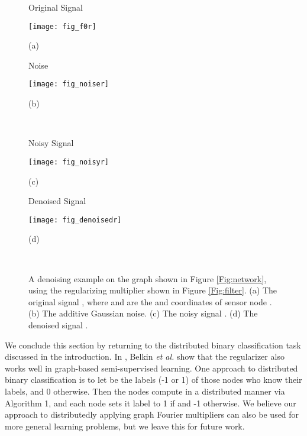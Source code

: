 \documentclass[conference]{IEEEtran}
\begin{document}
\begin{figure}[tb]
\centering
\begin{minipage}[b]{0.43\linewidth}
   \centering
   \centerline{\small{Original Signal}}
   \centerline{\texttt{[image: fig\_f0r]}}
\centerline{\small{(a)}}
\end{minipage}
\hfill
\begin{minipage}[b]{0.43\linewidth}
   \centering
   \centerline{\small{Noise}}
   \centerline{\texttt{[image: fig\_noiser]}}
\centerline{\small{(b)}}
\end{minipage}\\
\vspace{0.4cm}
\begin{minipage}[b]{0.43\linewidth}
   \centering
   \centerline{\small{Noisy Signal}}
   \centerline{\texttt{[image: fig\_noisyr]}}
\centerline{\small{(c)}}
\end{minipage}
\hfill
\begin{minipage}[b]{0.43\linewidth}
   \centering
   \centerline{\small{Denoised Signal}}
   \centerline{\texttt{[image: fig\_denoisedr]}}
\centerline{\small{(d)}}
\end{minipage}\\
\caption {A denoising example on the graph shown in Figure \ref{Fig:network}, using the regularizing multiplier shown in Figure \ref{Fig:filter}. (a) The original signal , where  and  are the  and  coordinates of sensor node . (b) The additive Gaussian noise. (c) The noisy signal . (d) The denoised signal .}
  \label{Fig:denoising}
\end{figure}


We conclude this section by returning to the distributed binary classification task discussed in the introduction. In \cite{belkin_matveeva}, Belkin \emph{et al.} show that the regularizer  also works well in graph-based semi-supervised learning. One approach to distributed binary classification is to let  be the labels (-1 or 1) of those nodes who know their labels, and 0 otherwise. Then the nodes compute  in a distributed manner via Algorithm 1, and each node  sets it label to 1 if
 and -1 otherwise. We believe our approach to distributedly applying graph Fourier multipliers can also be used
for more general learning problems, but we leave this for future work.
\end{document}
